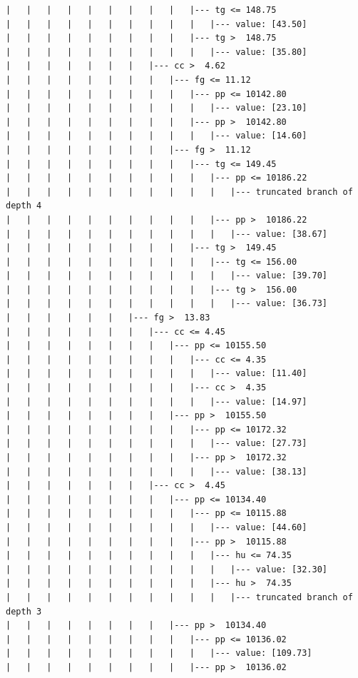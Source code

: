 \documentclass[UTF8, a4paper]{ctexart}
\begin{document}
\begin{lstlisting}
|   |   |   |   |   |   |   |   |   |--- tg <= 148.75
|   |   |   |   |   |   |   |   |   |   |--- value: [43.50]
|   |   |   |   |   |   |   |   |   |--- tg >  148.75
|   |   |   |   |   |   |   |   |   |   |--- value: [35.80]
|   |   |   |   |   |   |   |--- cc >  4.62
|   |   |   |   |   |   |   |   |--- fg <= 11.12
|   |   |   |   |   |   |   |   |   |--- pp <= 10142.80
|   |   |   |   |   |   |   |   |   |   |--- value: [23.10]
|   |   |   |   |   |   |   |   |   |--- pp >  10142.80
|   |   |   |   |   |   |   |   |   |   |--- value: [14.60]
|   |   |   |   |   |   |   |   |--- fg >  11.12
|   |   |   |   |   |   |   |   |   |--- tg <= 149.45
|   |   |   |   |   |   |   |   |   |   |--- pp <= 10186.22
|   |   |   |   |   |   |   |   |   |   |   |--- truncated branch of depth 4
|   |   |   |   |   |   |   |   |   |   |--- pp >  10186.22
|   |   |   |   |   |   |   |   |   |   |   |--- value: [38.67]
|   |   |   |   |   |   |   |   |   |--- tg >  149.45
|   |   |   |   |   |   |   |   |   |   |--- tg <= 156.00
|   |   |   |   |   |   |   |   |   |   |   |--- value: [39.70]
|   |   |   |   |   |   |   |   |   |   |--- tg >  156.00
|   |   |   |   |   |   |   |   |   |   |   |--- value: [36.73]
|   |   |   |   |   |   |--- fg >  13.83
|   |   |   |   |   |   |   |--- cc <= 4.45
|   |   |   |   |   |   |   |   |--- pp <= 10155.50
|   |   |   |   |   |   |   |   |   |--- cc <= 4.35
|   |   |   |   |   |   |   |   |   |   |--- value: [11.40]
|   |   |   |   |   |   |   |   |   |--- cc >  4.35
|   |   |   |   |   |   |   |   |   |   |--- value: [14.97]
|   |   |   |   |   |   |   |   |--- pp >  10155.50
|   |   |   |   |   |   |   |   |   |--- pp <= 10172.32
|   |   |   |   |   |   |   |   |   |   |--- value: [27.73]
|   |   |   |   |   |   |   |   |   |--- pp >  10172.32
|   |   |   |   |   |   |   |   |   |   |--- value: [38.13]
|   |   |   |   |   |   |   |--- cc >  4.45
|   |   |   |   |   |   |   |   |--- pp <= 10134.40
|   |   |   |   |   |   |   |   |   |--- pp <= 10115.88
|   |   |   |   |   |   |   |   |   |   |--- value: [44.60]
|   |   |   |   |   |   |   |   |   |--- pp >  10115.88
|   |   |   |   |   |   |   |   |   |   |--- hu <= 74.35
|   |   |   |   |   |   |   |   |   |   |   |--- value: [32.30]
|   |   |   |   |   |   |   |   |   |   |--- hu >  74.35
|   |   |   |   |   |   |   |   |   |   |   |--- truncated branch of depth 3
|   |   |   |   |   |   |   |   |--- pp >  10134.40
|   |   |   |   |   |   |   |   |   |--- pp <= 10136.02
|   |   |   |   |   |   |   |   |   |   |--- value: [109.73]
|   |   |   |   |   |   |   |   |   |--- pp >  10136.02

\end{lstlisting}
\end{document}
